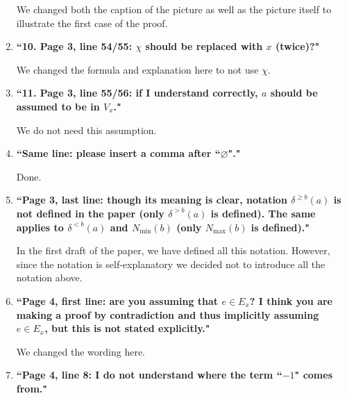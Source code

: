 \documentclass[11pt]{article}
\begin{document}
\begin{enumerate}
	\smallskip
	
       We changed both the caption of the picture as well as the picture itself to illustrate the first case of the proof.
	
	\bigskip

	\item \textbf{``10. Page 3, line 54/55: $\chi$ should be replaced with $x$ (twice)?"}
	
	\smallskip
	
	We changed the formula and explanation here to not use $\chi$.
	
	\bigskip
	
	\item \textbf{``11. Page 3, line 55/56: if I understand correctly, $a$ should be assumed to be in $V_x$."}
	
	\smallskip
	
	We do not need this assumption.
	
	\bigskip
	
	\item \textbf{``Same line: please insert a comma after ``$\varnothing$"."}
	
	\smallskip
	
	Done.
	
	\bigskip
	
	\item \textbf{``Page 3, last line: though its meaning is clear, notation $\delta^{\ge b}(a)$ is not defined in the paper (only $\delta^{> b}(a)$ is defined). The same applies to $\delta^{< b}(a)$ and $N_{\min}(b)$ (only $N_{\max}(b)$ is defined)."}
	
	\smallskip
	
	In the first draft of the paper, we have defined all this notation. However, since the notation is self-explanatory we decided not to introduce all the notation above.
	
	\bigskip
	
	\item \textbf{``Page 4, first line: are you assuming that $e\in E_x$? I think you are making a proof by
contradiction and thus implicitly assuming $e\in E_x$, but this is not stated explicitly."}
	
	\smallskip
	
	We changed the wording here.
	
	\bigskip
	
	
	\item \textbf{``Page 4, line 8: I do not understand where the term ``$-1$" comes from."}
	

\end{enumerate}
\end{document}

